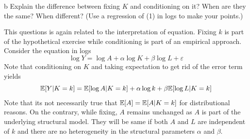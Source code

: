\documentclass{article}
\begin{document}
\begin{problem}{b}
Explain the difference between fixing $K$ and conditioning on it? When are they the same? When different? (Use a regression of (1) in logs to make your points.)
\end{problem}
\begin{solution}
This questions is again related to the interpretation of equation. Fixing $k$ is part of the hypothetical exercise while conditioning is part of an empirical approach. Consider the equation in logs
\begin{equation*}
    \log Y = \log A + \alpha\log K +\beta\log L + \varepsilon
\end{equation*}
Note that conditioning on $K$ and taking expectation to get rid of the error term yields 
\begin{equation*}
    \mathbb{E}[Y\vert K=k] = \mathbb{E}[\log A\vert K=k] + \alpha \log k + \beta\mathbb{E}[\log L\vert K=k]
\end{equation*}
Note that its not necessarily true that $\mathbb{E}[A]=\mathbb{E}[A\vert K=k]$ for distributional reasons. On the contrary, while fixing, $A$ remains unchanged as $A$ is part of the underlying structural model.  They will be same if both $A$ and $L$ are independent of $k$ and there are no heterogeneity in the structural parameters $\alpha$ and $\beta$.
\end{solution}

\newpage
\end{document}
